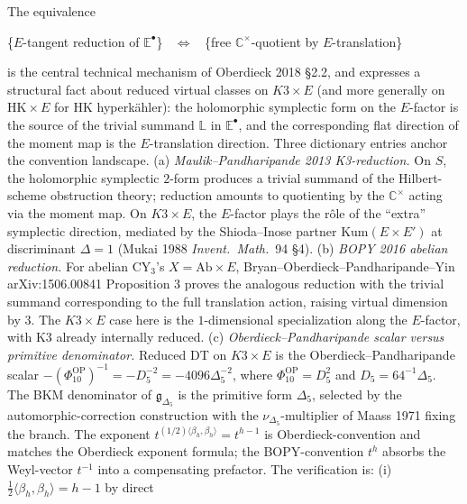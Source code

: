 \begin{remark}
\label{rem:cy-c-beyond-k3e-reduction-c-star-quotient-audit}
The equivalence
\begin{center}
\{$E$-tangent reduction of $\mathbb E^\bullet$\}
$\;\;\Longleftrightarrow\;\;$
\{free $\mathbb C^\times$-quotient by $E$-translation\}
\end{center}
is the central technical mechanism of Oberdieck 2018 \S 2.2, and
expresses a structural fact about reduced virtual classes on
$K3\times E$ (and more generally on $\mathrm{HK}\times E$ for
$\mathrm{HK}$ hyperk\"ahler): the holomorphic symplectic form on the
$E$-factor is the source of the trivial summand $\mathbb L$ in
$\mathbb E^\bullet$, and the corresponding flat direction of the moment
map is the $E$-translation direction. Three dictionary entries anchor
the convention landscape.
\textup{(a)} \emph{Maulik--Pandharipande 2013 K3-reduction.} On
$S$, the holomorphic symplectic $2$-form produces a trivial summand of
the Hilbert-scheme obstruction theory; reduction amounts to
quotienting by the $\mathbb C^\times$ acting via the moment map. On
$K3\times E$, the $E$-factor plays the r\^ole of the ``extra''
symplectic direction, mediated by the Shioda--Inose partner
$\mathrm{Kum}(E\times E')$ at discriminant $\Delta=1$ (Mukai 1988
\emph{Invent.\ Math.}~94 \S 4).
\textup{(b)} \emph{BOPY 2016 abelian reduction.} For abelian
CY$_3$'s $X=\mathrm{Ab}\times E$, Bryan--Oberdieck--Pandharipande--Yin
arXiv:1506.00841 Proposition 3 proves the analogous reduction with the
trivial summand corresponding to the full translation action, raising
virtual dimension by $3$. The $K3\times E$ case here is the
$1$-dimensional specialization along the $E$-factor, with K3 already
internally reduced.
	\textup{(c)} \emph{Oberdieck--Pandharipande scalar versus primitive denominator.}
	Reduced DT on $K3\times E$ is the Oberdieck--Pandharipande scalar
	$-(\Phi_{10}^{\mathrm{OP}})^{-1}=-D_5^{-2}
	=-4096\Delta_5^{-2}$, where
$\Phi_{10}^{\mathrm{OP}}=D_5^2$ and $D_5=64^{-1}\Delta_5$. The BKM
denominator of $\mathfrak g_{\Delta_5}$ is the primitive form
$\Delta_5$, selected by the automorphic-correction construction with
the $\nu_{\Delta_5}$-multiplier of Maass 1971 fixing the branch. The
exponent $t^{(1/2)\langle\beta_h,\beta_h\rangle}=t^{h-1}$
is Oberdieck-convention and matches the Oberdieck exponent formula;
the BOPY-convention $t^h$ absorbs the Weyl-vector $t^{-1}$ into a
compensating prefactor.
The verification is:
\textup{(i)} $\tfrac12\langle\beta_h,\beta_h\rangle=h-1$ by direct

\end{remark}
